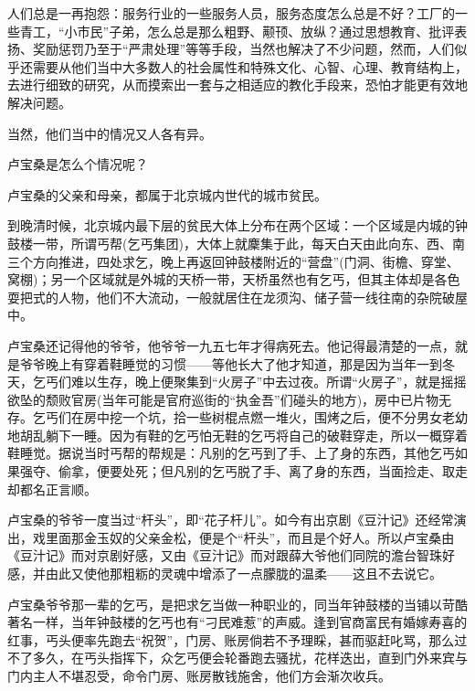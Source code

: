 \par 人们总是一再抱怨：服务行业的一些服务人员，服务态度怎么总是不好？工厂的一些青工，“小市民”子弟，怎么总是那么粗野、颟顸、放纵？通过思想教育、批评表扬、奖励惩罚乃至于“严肃处理”等等手段，当然也解决了不少问题，然而，人们似乎还需要从他们当中大多数人的社会属性和特殊文化、心智、心理、教育结构上，去进行细致的研究，从而摸索出一套与之相适应的教化手段来，恐怕才能更有效地解决问题。
\par 当然，他们当中的情况又人各有异。
\par 卢宝桑是怎么个情况呢？
\par 卢宝桑的父亲和母亲，都属于北京城内世代的城市贫民。
\par 到晚清时候，北京城内最下层的贫民大体上分布在两个区域：一个区域是内城的钟鼓楼一带，所谓丐帮(乞丐集团)，大体上就麇集于此，每天白天由此向东、西、南三个方向推进，四处求乞，晚上再返回钟鼓楼附近的“营盘”(门洞、街檐、穿堂、窝棚)；另一个区域就是外城的天桥一带，天桥虽然也有乞丐，但其主体却是各色耍把式的人物，他们不大流动，一般就居住在龙须沟、储子营一线往南的杂院破屋中。
\par 卢宝桑还记得他的爷爷，他爷爷一九五七年才得病死去。他记得最清楚的一点，就是爷爷晚上有穿着鞋睡觉的习惯——等他长大了他才知道，那是因为当年一到冬天，乞丐们难以生存，晚上便聚集到“火房子”中去过夜。所谓“火房子”，就是摇摇欲坠的颓败官房(当年可能是官府巡街的“执金吾”们碰头的地方)，房中已片物无存。乞丐们在房中挖一个坑，拾一些树棍点燃一堆火，围烤之后，便不分男女老幼地胡乱躺下一睡。因为有鞋的乞丐怕无鞋的乞丐将自己的破鞋穿走，所以一概穿着鞋睡觉。据说当时丐帮的帮规是：凡别的乞丐到了手、上了身的东西，其他乞丐如果强夺、偷拿，便要处死；但凡别的乞丐脱了手、离了身的东西，当面捡走、取走却都名正言顺。
\par 卢宝桑的爷爷一度当过“杆头”，即“花子杆儿”。如今有出京剧《豆汁记》还经常演出，戏里面那金玉奴的父亲金松，便是个“杆头”，而且是个好人。所以卢宝桑由《豆汁记》而对京剧好感，又由《豆汁记》而对跟薛大爷他们同院的澹台智珠好感，并由此又使他那粗粝的灵魂中增添了一点朦胧的温柔——这且不去说它。
\par 卢宝桑爷爷那一辈的乞丐，是把求乞当做一种职业的，同当年钟鼓楼的当铺以苛酷著名一样，当年钟鼓楼的乞丐也有“刁民难惹”的声威。逢到官商富民有婚嫁寿喜的红事，丐头便率先跑去“祝贺”，门房、账房倘若不予理睬，甚而驱赶叱骂，那么过不了多久，在丐头指挥下，众乞丐便会轮番跑去骚扰，花样迭出，直到门外来宾与门内主人不堪忍受，命令门房、账房散钱施舍，他们方会渐次收兵。
